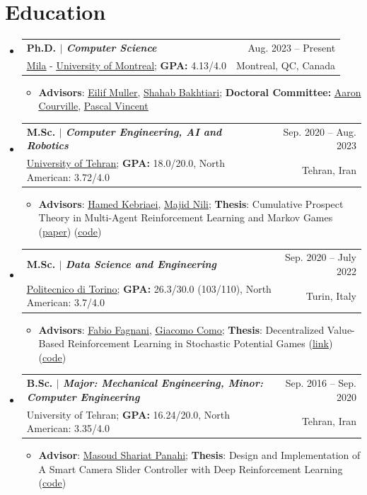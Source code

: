 \documentclass[A4,11pt]{article}
\makeatletter
\newcommand{\CVItem}[1]{
  \item\small{
    {#1 \vspace{-2pt}}
  }
}
\newcommand{\CVSubheading}[4]{
  \vspace{-2pt}\item
    \begin{tabular*}{0.97\textwidth}[t]{l@{\extracolsep{\fill}}r}
      \textbf{#1} & #2 \\
      \small#3 & \small #4 \\
    \end{tabular*}\vspace{-7pt}
}
\newcommand{\CVSubHeadingListStart}{\begin{itemize}[leftmargin=0.5cm, label={}]}
\newcommand{\CVSubHeadingListEnd}{\end{itemize}}
\newcommand{\CVItemListStart}{\begin{itemize}}
\newcommand{\CVItemListEnd}{\end{itemize}\vspace{-5pt}}
\makeatother
\begin{document}
\section{Education}
  \CVSubHeadingListStart
    \CVSubheading
      {{Ph.D. $|$ \emph{Computer Science}}}{Aug. 2023 -- Present}
      {\href{https://mila.quebec/en/}{\underline{Mila}} - \href{https://diro.umontreal.ca/english/home/}{\underline{University of Montreal}}; \textbf{GPA:} 4.13/4.0}{Montreal, QC, Canada}
      \CVItemListStart
        \CVItem{\textbf{Advisors}: \href{https://scholar.google.ch/citations?user=r4-NZhwAAAAJ&hl=en}{\underline{Eilif Muller}},
        \href{https://scholar.google.com/citations?user=f_JDOhEAAAAJ&hl=en}{\underline{Shahab Bakhtiari}}; \textbf{Doctoral Committee:} \href{https://scholar.google.com/citations?hl=en&user=km6CP8cAAAAJ&view_op=list_works}{\underline{Aaron Courville}},
        \href{https://scholar.google.com/citations?hl=en&user=WBCKQMsAAAAJ&view_op=list_works}{\underline{Pascal Vincent}}}
      \CVItemListEnd
    \CVSubheading
      {{M.Sc. $|$ \emph{Computer Engineering, AI and Robotics}}}{Sep. 2020 -- Aug. 2023}
      {\href{https://ut.ac.ir/en}{\underline{University of Tehran}}; \textbf{GPA:} 18.0/20.0, North American: 3.72/4.0}{Tehran, Iran}
      \CVItemListStart
        \CVItem{\textbf{Advisors}: \href{https://scholar.google.com/citations?user=eDseLNYAAAAJ&hl=en}{\underline{Hamed Kebriaei}},
        \href{https://scholar.google.com/citations?user=QlwWxmoAAAAJ&hl=en}{\underline{Majid Nili}}; \textbf{Thesis}: Cumulative Prospect Theory in Multi-Agent Reinforcement Learning and Markov Games
        	(\href{https://arxiv.org/abs/2402.05906}{\underline{paper}}) (\href{https://github.com/hafezgh/risk-sensitive-marl-namg}{\underline{code}})}
      \CVItemListEnd
    \CVSubheading
      {{M.Sc. $|$ \emph{\small{Data Science and Engineering}}}}{Sep. 2020 -- July 2022}
      {\href{https://www.polito.it/en?lang=en}{\underline{Politecnico di Torino}}; \textbf{GPA:} 26.3/30.0 (103/110), North American: 3.7/4.0}{Turin, Italy}
      \CVItemListStart
        \CVItem{\textbf{Advisors}: \href{https://scholar.google.com/citations?user=oqwlDQEAAAAJ&hl=en}{\underline{Fabio Fagnani}},
        \href{https://scholar.google.com/citations?user=7dju3QoAAAAJ&hl=en}{\underline{Giacomo Como}}; \textbf{Thesis}: Decentralized Value-Based Reinforcement Learning in Stochastic Potential Games (\href{https://webthesis.biblio.polito.it/23450/}{\underline{link}}) (\href{https://github.com/hafezgh/PoliTo-MSc-Thesis}{\underline{code}})}
      \CVItemListEnd
    \CVSubheading
      {{B.Sc. $|$ \emph{\small{Major: Mechanical Engineering, Minor: Computer Engineering}}}}{Sep. 2016 -- Sep. 2020}
      {{University of Tehran}; \textbf{GPA:} 16.24/20.0, North American: 3.35/4.0}{Tehran, Iran}
    \CVItemListStart
        \CVItem{\textbf{Advisor}: \href{https://scholar.google.com/citations?user=UwlyBw0AAAAJ&hl=en}{\underline{Masoud Shariat Panahi}}; \textbf{Thesis}: Design and Implementation of A Smart Camera Slider Controller with Deep Reinforcement Learning (\href{https://github.com/hafezgh/bahcelor_thesis}{\underline{code}})}
    \CVItemListEnd
  \CVSubHeadingListEnd
\end{document}
